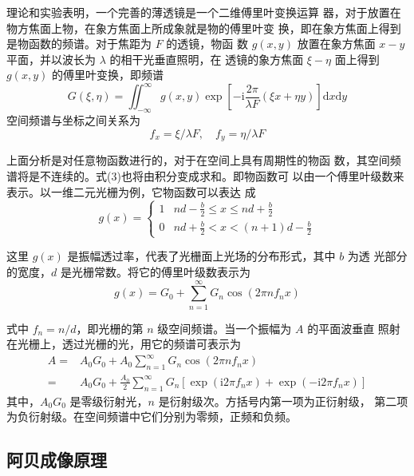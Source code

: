 \documentclass[12pt]{article}
\begin{document}
理论和实验表明，一个完善的薄透镜是一个二维傅里叶变换运算
器，对于放置在物方焦面上物，在象方焦面上所成象就是物的傅里叶变
换，即在象方焦面上得到是物函数的频谱。对于焦距为 $F$ 的透镜，物函
数 $g(x,y)$ 放置在象方焦面 $x-y$ 平面，并以波长为 $\lambda$ 的相干光垂直照明，在
透镜的象方焦面 $\xi−\eta$ 面上得到 $g(x,y)$ 的傅里叶变换，即频谱
\begin{equation}
    G(\xi,\eta)=\iint_{-\infty}^{\infty}g(x,y)\exp\left[-\mathrm i \frac{2\pi}{\lambda F}(\xi x+\eta y) \right]\mathrm dx\mathrm dy
\end{equation}
空间频谱与坐标之间关系为
\begin{equation}
    f_x=\xi/\lambda F ,\quad f_y=\eta/\lambda F
\end{equation}

上面分析是对任意物函数进行的，对于在空间上具有周期性的物函
数，其空间频谱将是不连续的。式(3)也将由积分变成求和。即物函数可
以由一个傅里叶级数来表示。以一维二元光栅为例，它物函数可以表达
成
\begin{equation}
    g(x)=\begin{cases}
        1& nd-\frac b2\le x\le nd+\frac b2\\
        0& nd+\frac b2<x<(n+1)d-\frac{b}{2}
    \end{cases}
\end{equation}

这里 $g(x)$ 是振幅透过率，代表了光栅面上光场的分布形式，其中 $b$ 为透
光部分的宽度，$d$ 是光栅常数。将它的傅里叶级数表示为
\begin{equation}
    g(x)=G_0+\sum_{n=1}^\infty G_n \cos(2\pi n f_nx)
\end{equation}

式中 $f_n=n/d$，即光栅的第 $n$ 级空间频谱。当一个振幅为 $A$ 的平面波垂直
照射在光栅上，透过光栅的光，用它的频谱可表示为
\begin{equation}
    \begin{aligned}
        A=&A_0G_0+A_0\sum_{n=1}^{\infty}G_n\cos(2\pi nf_nx)\\
        =&A_0G_0+\frac{A_0}{2}\sum_{n=1}^{\infty}G_n[\exp(\mathrm i2\pi f_nx)+\exp(-\mathrm{i}2\pi f_nx)]
    \end{aligned}
\end{equation}
其中，$A_0G_0$ 是零级衍射光，$n$ 是衍射级次。方括号内第一项为正衍射级，
第二项为负衍射级。在空间频谱中它们分别为零频，正频和负频。 

\subsection{阿贝成像原理}
\end{document}

